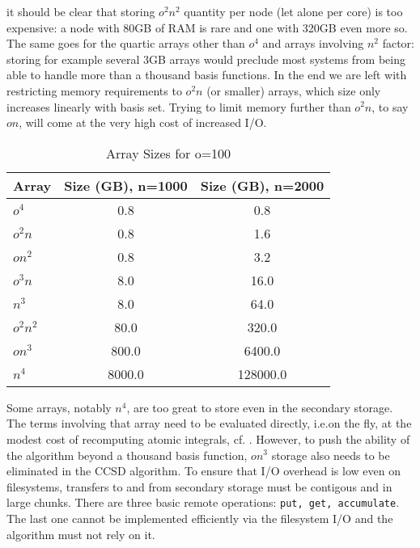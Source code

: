 \documentclass[12pt]{article} \usepackage[margin=1in]{geometry}
\begin{document}
it should be clear that storing $o^2n^2$ quantity per node (let alone
per core) is too expensive: a node with 80GB of RAM is rare and one
with  320GB even more so.  The same goes for the quartic arrays other
than $o^4$ and arrays involving $n^2$ factor: storing for example
several 3GB arrays would preclude most systems from being able to
handle more than a thousand basis functions. In the end we are left
with restricting memory requirements to $o^2n$ (or smaller) arrays,
which size only increases linearly with basis set.
Trying to limit memory further than $o^2n$, to say $on$, will come at
the very high cost of increased I/O.

\begin{table}
  \label{limits}
  \caption {Array Sizes for o=100}
  \begin{center}
    \begin{tabular}{| l | c | c |}
      \hline
      Array     & Size (GB), n=1000 & Size (GB), n=2000 \\
      \hline
      $o^4$     & 0.8               & 0.8               \\ 
      $o^2n$    & 0.8               & 1.6               \\
      \hline
      $on^2$    & 0.8               & 3.2              \\
      $o^3n$    & 8.0               & 16.0              \\
      $n^3$     & 8.0               & 64.0              \\
      $o^2n^2$  & 80.0              & 320.0             \\
      \hline
      $on^3$    & 800.0             & 6400.0             \\
      $n^4$     & 8000.0            & 128000.0             \\
      \hline
    \end{tabular}
  \end{center}
\end{table}

Some arrays, notably $n^4$, are too great to store even in the
secondary storage.  The terms involving that array need to be
evaluated directly, i.e.on the fly,  at the modest cost of recomputing
atomic integrals, cf. \cite{olson2007novel}.
However, to push the ability of the algorithm beyond a
thousand basis function, $on^3$ storage also needs to be eliminated in
the CCSD algorithm.
To ensure that I/O overhead is low even on filesystems, transfers to
and from secondary storage must be contigous and in large chunks.
There are three basic remote operations: {\tt put, get, accumulate}.
The last one cannot be implemented efficiently via
the filesystem I/O and the algorithm must not rely on it.
\end{document}
